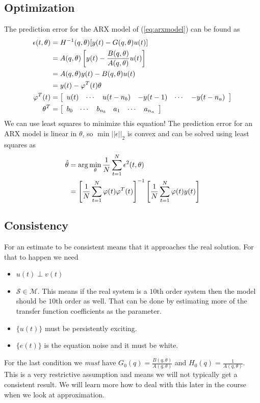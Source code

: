\subsection{Optimization}
The prediction error for the ARX model of (\ref{eq:arxmodel}) can be found as
\begin{align*}
\epsilon(t,\theta) &= H^{-1}(q,\theta)[y(t)-G(q,\theta)u(t)] \\
&= A(q,\theta)\left[y(t)-\frac{B(q,\theta)}{A(q,\theta)}u(t)\right] \\
&= A(q,\theta)y(t)-B(q,\theta)u(t) \\
&= y(t)-\varphi^T(t)\theta \\
\varphi^T(t) &= \left[\begin{array}{c c c c c c} u(t) & \cdots & u(t-n_b) & -y(t-1) & \cdots & -y(t-n_a) \end{array}\right] \\
\theta^T &= \left[\begin{array}{c c c c c c} b_0 & \cdots & b_{n_b} & a_1 & \cdots & a_{n_a} \end{array}\right]
\end{align*}
We can use least squares to minimize this equation! The prediction error for an ARX model is linear in $\theta$, so $\min||\epsilon||_2$ is convex and can be solved using least squares as
\begin{align*}
\hat{\theta} &= \arg\min_\theta\frac{1}{N} \sum_{t=1}^N \epsilon^2(t,\theta) \\
&= \left[\frac{1}{N}\sum_{t=1}^N\varphi(t)\varphi^T(t)\right]^{-1} \left[\frac{1}{N}\sum_{t=1}^N\varphi(t)y(t)\right]
\end{align*}

\subsection{Consistency}
For an estimate to be consistent means that it approaches the real solution. For that to happen we need
\begin{itemize}
\item $u(t)\perp v(t)$
\item $\mathcal{S}\in\mathcal{M}$. This means if the real system is a $10$th order system then the model should be $10$th order as well. That can be done by estimating more of the transfer function coefficients as the parameter.
\item $\{u(t)\}$ must be persistently exciting.
\item $\{e(t)\}$ is the equation noise and it must be white.
\end{itemize}
For the last condition we \textit{must} have $G_0(q)=\frac{B(q,\theta)}{A(q,\theta)}$ and $H_0(q)=\frac{1}{A(q,\theta)}$. This is a very restrictive assumption and means we will not typically get a consistent result. We will learn more how to deal with this later in the course when we look at approximation.

